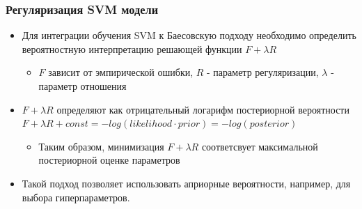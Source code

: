 \documentclass{beamer}
\begin{document}
\begin{frame}
	\frametitle{Регуляризация SVM модели}
	\begin{itemize}
		\item Для интеграции обучения SVM к Баесовскую подходу необходимо определить
		      вероятностную интерпретацию решающей функции $F + \lambda R$
		      \begin{itemize}
			      \item $F$ зависит от эмпирической ошибки, $R$ - параметр
			            регуляризации,
			            $\lambda$ - параметр отношения
		      \end{itemize}

		\item $F + \lambda R$ определяют как отрицательный
		      логарифм постериорной вероятности $F + \lambda R + const =
			      -log(likelihood \cdot prior) = -log(posterior)$
		      \begin{itemize}
			      \item Таким образом, минимизация $F + \lambda R$ соответсвует максимальной постериорной оценке параметров
		      \end{itemize}
		\item Такой подход позволяет использовать априорные вероятности, например,
		      для выбора гиперпараметров.


	\end{itemize}
\end{frame}
\end{document}
